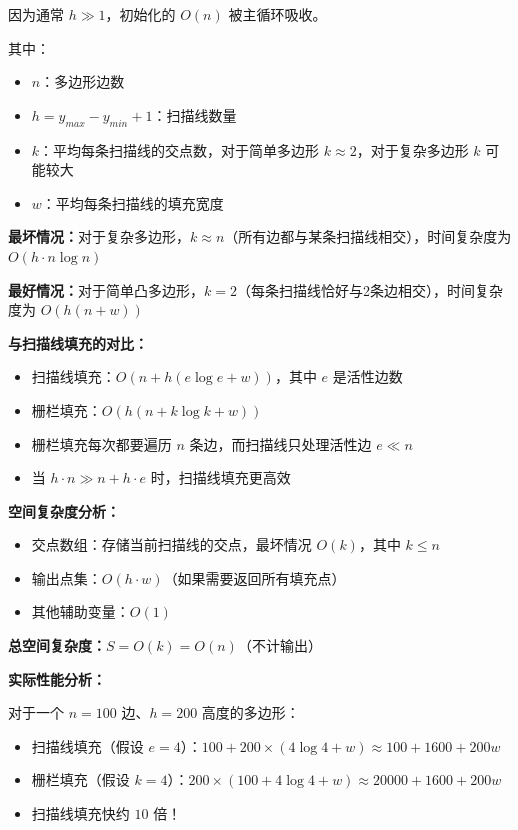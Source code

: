 ﻿\documentclass[12pt,a4paper]{article}
\begin{document}
因为通常 $h \gg 1$，初始化的 $O(n)$ 被主循环吸收。

其中：
\begin{itemize}
\item $n$：多边形边数
\item $h = y_{max} - y_{min} + 1$：扫描线数量
\item $k$：平均每条扫描线的交点数，对于简单多边形 $k \approx 2$，对于复杂多边形 $k$ 可能较大
\item $w$：平均每条扫描线的填充宽度
\end{itemize}

\textbf{最坏情况：}对于复杂多边形，$k \approx n$（所有边都与某条扫描线相交），时间复杂度为 $O(h \cdot n \log n)$

\textbf{最好情况：}对于简单凸多边形，$k = 2$（每条扫描线恰好与2条边相交），时间复杂度为 $O(h(n + w))$

\textbf{与扫描线填充的对比：}
\begin{itemize}
\item 扫描线填充：$O(n + h(e \log e + w))$，其中 $e$ 是活性边数
\item 栅栏填充：$O(h(n + k \log k + w))$
\item 栅栏填充每次都要遍历 $n$ 条边，而扫描线只处理活性边 $e \ll n$
\item 当 $h \cdot n \gg n + h \cdot e$ 时，扫描线填充更高效
\end{itemize}

\vspace{3mm}
\textbf{空间复杂度分析：}

\begin{itemize}
\item 交点数组：存储当前扫描线的交点，最坏情况 $O(k)$，其中 $k \leq n$
\item 输出点集：$O(h \cdot w)$（如果需要返回所有填充点）
\item 其他辅助变量：$O(1)$
\end{itemize}

\textbf{总空间复杂度：}$S = O(k) = O(n)$（不计输出）

\textbf{实际性能分析：}

对于一个 $n=100$ 边、$h=200$ 高度的多边形：
\begin{itemize}
\item 扫描线填充（假设 $e=4$）：$100 + 200 \times (4 \log 4 + w) \approx 100 + 1600 + 200w$
\item 栅栏填充（假设 $k=4$）：$200 \times (100 + 4 \log 4 + w) \approx 20000 + 1600 + 200w$
\item 扫描线填充快约 $10$ 倍！
\end{itemize}
\end{document}
